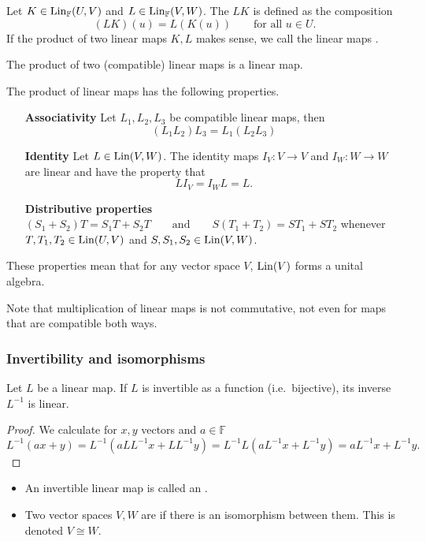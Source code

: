 \begin{definition}
Let $K\in \operatorname{Lin}_\mathbb{F}(U,V)$ and $L\in \operatorname{Lin}_\mathbb{F}(V,W)$. The  $LK$ is defined as the composition
\[ (LK)(u) = L(K(u)) \qquad \text{for all $u\in U$.} \]
If the product of two linear maps $K,L$ makes sense, we call the linear maps .
\end{definition}
\begin{proposition}
The product of two (compatible) linear maps is a linear map.
\end{proposition}
\begin{proposition} \label{linearMapsAlgebra}
The product of linear maps has the following properties. 
\begin{itemize}[leftmargin=4.2cm]
\item[\textbf{Associativity}] Let $L_1, L_2, L_3$ be compatible linear maps, then
\[ (L_1L_2)L_3 = L_1(L_2L_3) \]
\item[\textbf{Identity}] Let $L\in \operatorname{Lin}(V,W)$. The identity maps $I_V:V\to V$ and $I_W:W\to W$ are linear and have the property that
\[ LI_V = I_W L = L. \]
\item[\textbf{Distributive properties}]
$ (S_1+S_2)T = S_1T + S_2T \qquad \text{and} \qquad S(T_1 + T_2) = ST_1 + ST_2 $
whenever $T,T_1, T_2 \in \operatorname{Lin}(U,V)$ and $S,S_1, S_2\in \operatorname{Lin}(V,W)$.
\end{itemize}
These properties mean that for any vector space $V$, $\operatorname{Lin}(V)$ forms a unital algebra.
\end{proposition}
Note that multiplication of linear maps is not commutative, not even for maps that are compatible both ways.

\subsubsection{Invertibility and isomorphisms}
\begin{lemma} \label{inverseLinear}
Let $L$ be a linear map. If $L$ is invertible as a function (i.e.\ bijective), its inverse $L^{-1}$ is linear.
\end{lemma}
\begin{proof}
We calculate for $x,y$ vectors and $a\in\mathbb{F}$
\[ L^{-1}(ax + y) = L^{-1}(aLL^{-1}x + LL^{-1}y) = L^{-1}L(aL^{-1}x + L^{-1}y) = aL^{-1}x + L^{-1}y. \]
\end{proof}

\begin{definition}
\begin{itemize}
\item An invertible linear map is called an .
\item Two vector spaces $V,W$  are  if there is an isomorphism between them. This is denoted $V\cong W$.
\end{itemize}
\end{definition}

